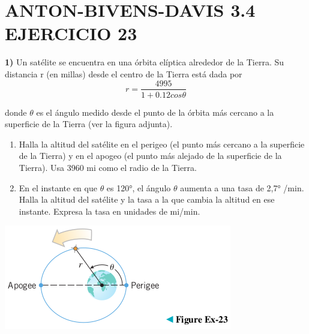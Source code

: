 \chapter*{ANTON-BIVENS-DAVIS 3.4 EJERCICIO 23}

\textbf{1)} Un satélite se encuentra en una órbita elíptica alrededor de la Tierra. Su distancia r (en millas) desde el centro de la Tierra está dada por$$r=\frac{4995}{1+0.12cos\theta}$$

donde $\theta$ es el ángulo medido desde el punto de la órbita más cercano a la superficie de la Tierra (ver la figura adjunta).
\begin{enumerate}[label=\alph*)]
	\item Halla la altitud del satélite en el perigeo (el punto más cercano a la superficie de la Tierra) y en el apogeo (el punto más alejado de la superficie de la Tierra). Usa 3960 mi como el radio de la Tierra.
	\item En el instante en que $\theta$ es 120°, el ángulo $\theta$ aumenta a una tasa de 2,7° /min. Halla la altitud del satélite y la tasa a la que cambia la altitud en ese instante. Expresa la tasa en unidades de mi/min.
\end{enumerate}

\begin{center}
	\includegraphics[height = 0.14\textheight]{recursos/image.png}\par
\end{center}


